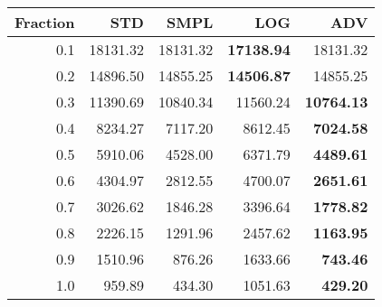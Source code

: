 \documentclass{standalone}
\begin{document}
\begin{tabular}{r|rrrr}
      \toprule
      Fraction & STD & SMPL & LOG & ADV\\
      \midrule
      0.1 & 18131.32 & 18131.32 & \textbf{17138.94} & 18131.32\\
  0.2 & 14896.50 & 14855.25 & \textbf{14506.87} & 14855.25\\
  0.3 & 11390.69 & 10840.34 & 11560.24 & \textbf{10764.13}\\
  0.4 & 8234.27 & 7117.20 & 8612.45 & \textbf{7024.58}\\
  0.5 & 5910.06 & 4528.00 & 6371.79 & \textbf{4489.61}\\
  0.6 & 4304.97 & 2812.55 & 4700.07 & \textbf{2651.61}\\
  0.7 & 3026.62 & 1846.28 & 3396.64 & \textbf{1778.82}\\
  0.8 & 2226.15 & 1291.96 & 2457.62 & \textbf{1163.95}\\
  0.9 & 1510.96 & 876.26 & 1633.66 & \textbf{743.46}\\
  1.0 & 959.89 & 434.30 & 1051.63 & \textbf{429.20}\\
  \bottomrule
\end{tabular}
\end{document}
